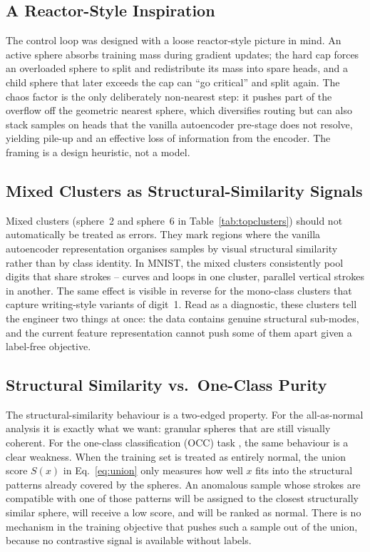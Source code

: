 \documentclass[conference]{IEEEtran}
\begin{document}
\subsection{A Reactor-Style Inspiration}
\label{sec:reactor}
The control loop was designed with a loose reactor-style picture in mind. An active sphere absorbs training mass during gradient updates; the hard cap forces an overloaded sphere to split and redistribute its mass into spare heads, and a child sphere that later exceeds the cap can ``go critical'' and split again. The chaos factor is the only deliberately non-nearest step: it pushes part of the overflow off the geometric nearest sphere, which diversifies routing but can also stack samples on heads that the vanilla autoencoder pre-stage does not resolve, yielding pile-up and an effective loss of information from the encoder. The framing is a design heuristic, not a model.

\subsection{Mixed Clusters as Structural-Similarity Signals}
Mixed clusters (sphere~2 and sphere~6 in Table~\ref{tab:topclusters}) should not automatically be treated as errors. They mark regions where the vanilla autoencoder representation organises samples by visual structural similarity rather than by class identity. In MNIST, the mixed clusters consistently pool digits that share strokes -- curves and loops in one cluster, parallel vertical strokes in another. The same effect is visible in reverse for the mono-class clusters that capture writing-style variants of digit~1. Read as a diagnostic, these clusters tell the engineer two things at once: the data contains genuine structural sub-modes, and the current feature representation cannot push some of them apart given a label-free objective.

\subsection{Structural Similarity vs.\ One-Class Purity}
\label{sec:occ_tradeoff}
The structural-similarity behaviour is a two-edged property. For the all-as-normal analysis it is exactly what we want: granular spheres that are still visually coherent. For the one-class classification (OCC) task \cite{pang2021deep}, the same behaviour is a clear weakness. When the training set is treated as entirely normal, the union score \(S(x)\) in Eq.~\ref{eq:union} only measures how well \(x\) fits into the structural patterns already covered by the spheres. An anomalous sample whose strokes are compatible with one of those patterns will be assigned to the closest structurally similar sphere, will receive a low score, and will be ranked as normal. There is no mechanism in the training objective that pushes such a sample out of the union, because no contrastive signal is available without labels.
\end{document}
